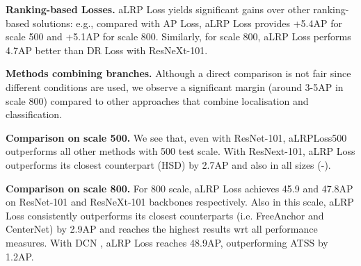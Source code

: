 \documentclass{article}
\begin{document}
\textbf{Ranking-based Losses.} aLRP Loss yields significant gains over other ranking-based solutions: e.g., compared with AP Loss, aLRP Loss provides +5.4AP for scale 500 and +5.1AP for scale 800. Similarly, for scale 800, aLRP Loss performs  4.7AP better than DR Loss with ResNeXt-101.

\textbf{Methods combining branches.} Although a direct comparison is not fair since different conditions are used, we observe a significant margin (around 3-5AP in scale 800) compared to other approaches that combine localisation and classification.

\textbf{Comparison on scale 500.} We see that, even with ResNet-101, aLRPLoss500  outperforms all other methods with 500 test scale. With ResNext-101, aLRP Loss outperforms its closest counterpart (HSD) by 2.7AP and also in all sizes (-).

\textbf{Comparison on scale 800.} For 800 scale, aLRP Loss achieves 45.9 and 47.8AP on ResNet-101 and ResNeXt-101 backbones respectively. Also in this scale, aLRP Loss consistently outperforms its closest counterparts (i.e. FreeAnchor and CenterNet) by 2.9AP and reaches the highest results wrt all performance measures. With DCN \cite{DCNv2}, aLRP Loss reaches 48.9AP, outperforming ATSS by 1.2AP.
\end{document}
